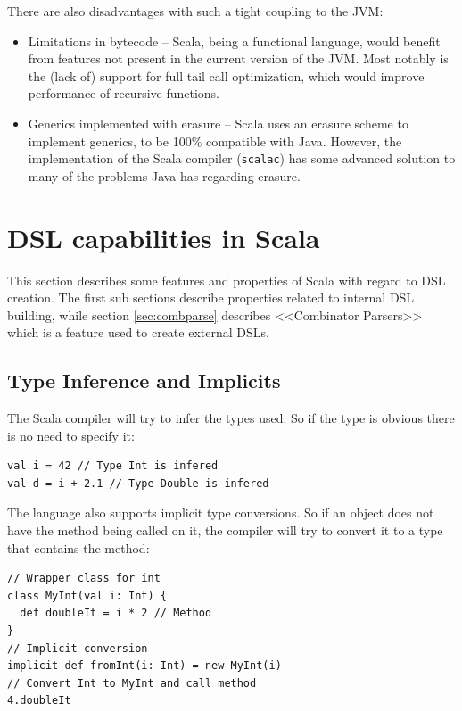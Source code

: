 \documentclass[a4paper,english]{report}
\begin{document}
There are also disadvantages with such a tight coupling to the JVM:

\begin{itemize}
\item Limitations in bytecode -- Scala, being a functional language,
  would benefit from features not present in the current version of
  the JVM. Most notably is the (lack of) support for full tail call
  optimization, which would improve performance of recursive
  functions.
\item Generics implemented with erasure -- Scala uses an erasure
  scheme to implement generics, to be 100\% compatible with
  Java. However, the implementation of the Scala compiler
  (\texttt{scalac}) has some advanced solution to many of the problems
  Java has regarding erasure\cite{emi06}.
\end{itemize}

\section{DSL capabilities in Scala}
\label{scaladsl}

This section describes some features and properties of Scala with
regard to DSL creation. The first sub sections describe properties
related to internal DSL building, while section \vref{sec:combparse}
describes <<Combinator Parsers>> which is a feature used to create
external DSLs.

\subsection{Type Inference and Implicits}

The Scala compiler will try to infer the types used. So if the type is
obvious there is no need to specify it:

\begin{lstlisting}
val i = 42 // Type Int is infered
val d = i + 2.1 // Type Double is infered
\end{lstlisting}

The language also supports implicit type conversions. So if an object
does not have the method being called on it, the compiler will try to
convert it to a type that contains the method:

\begin{lstlisting}
// Wrapper class for int
class MyInt(val i: Int) {
  def doubleIt = i * 2 // Method
}
// Implicit conversion
implicit def fromInt(i: Int) = new MyInt(i)
// Convert Int to MyInt and call method
4.doubleIt
\end{lstlisting}
\end{document}
